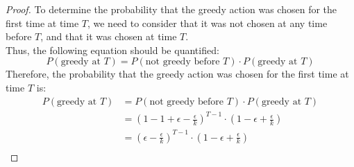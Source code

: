 \documentclass{article}
\begin{document}
\begin{enumerate}[a)]
\begin{enumerate}[i)]
\begin{proof}
            To determine the probability that the greedy action was chosen for the first time at time $T$, we need to consider that it was not chosen at any time before $T$, and that it was chosen at time $T$.\\
            Thus, the following equation should be quantified:
            \begin{equation*}
                P(\text{greedy at } T) = P(\text{not greedy before } T) \cdot P(\text{greedy at } T)
            \end{equation*}
            Therefore, the probability that the greedy action was chosen for the first time at time $T$ is:
            \begin{equation*}
                \begin{aligned}
                    P(\text{greedy at } T) &= P(\text{not greedy before } T) \cdot P(\text{greedy at } T)\\
                    &= \left(1 - 1 + \epsilon - \frac{\epsilon}{k}\right)^{T - 1} \cdot \left(1 - \epsilon + \frac{\epsilon}{k}\right)\\
                    &= \left(\epsilon - \frac{\epsilon}{k}\right)^{T - 1} \cdot \left(1 - \epsilon + \frac{\epsilon}{k}\right)\\
                \end{aligned}
            \end{equation*}\par
        \end{proof}


\end{enumerate}
\end{enumerate}
\end{document}
